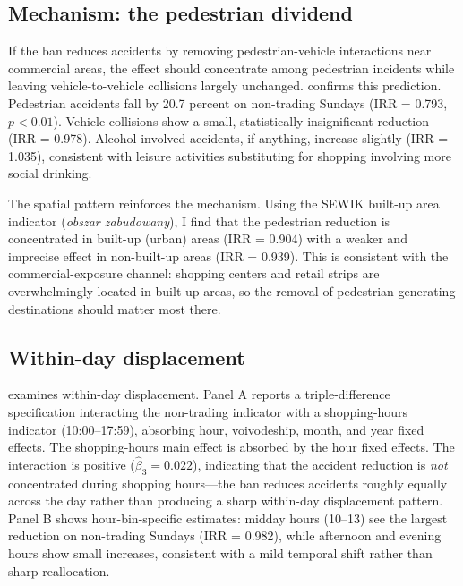 \documentclass[12pt]{article}
\begin{document}


\subsection{Mechanism: the pedestrian dividend}

If the ban reduces accidents by removing pedestrian-vehicle interactions near commercial areas, the effect should concentrate among pedestrian incidents while leaving vehicle-to-vehicle collisions largely unchanged.  confirms this prediction. Pedestrian accidents fall by 20.7 percent on non-trading Sundays (IRR = 0.793, $p < 0.01$). Vehicle collisions show a small, statistically insignificant reduction (IRR = 0.978). Alcohol-involved accidents, if anything, increase slightly (IRR = 1.035), consistent with leisure activities substituting for shopping involving more social drinking.

The spatial pattern reinforces the mechanism. Using the SEWIK built-up area indicator (\textit{obszar zabudowany}), I find that the pedestrian reduction is concentrated in built-up (urban) areas (IRR = 0.904) with a weaker and imprecise effect in non-built-up areas (IRR = 0.939). This is consistent with the commercial-exposure channel: shopping centers and retail strips are overwhelmingly located in built-up areas, so the removal of pedestrian-generating destinations should matter most there.



\subsection{Within-day displacement}

 examines within-day displacement. Panel A reports a triple-difference specification interacting the non-trading indicator with a shopping-hours indicator (10:00--17:59), absorbing hour, voivodeship, month, and year fixed effects. The shopping-hours main effect is absorbed by the hour fixed effects. The interaction is positive ($\hat{\beta}_3 = 0.022$), indicating that the accident reduction is \textit{not} concentrated during shopping hours---the ban reduces accidents roughly equally across the day rather than producing a sharp within-day displacement pattern. Panel B shows hour-bin-specific estimates: midday hours (10--13) see the largest reduction on non-trading Sundays (IRR = 0.982), while afternoon and evening hours show small increases, consistent with a mild temporal shift rather than sharp reallocation.
\end{document}
